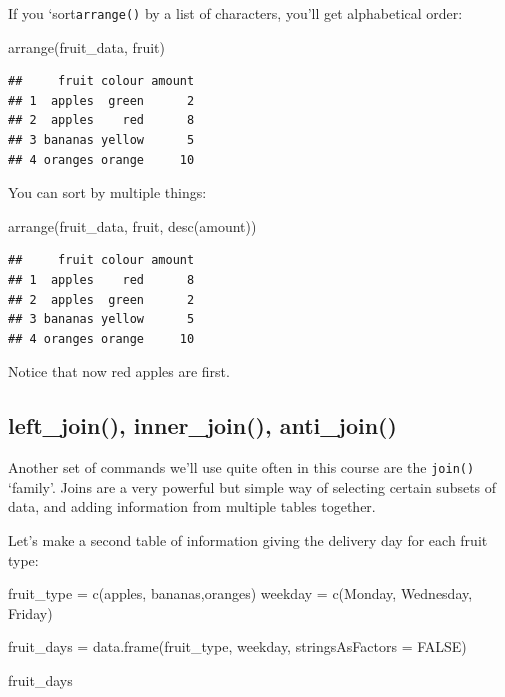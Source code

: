 \documentclass[
]{book}
\newenvironment{Shaded}{\begin{snugshade}}{\end{snugshade}}
\newcommand{\AttributeTok}[1]{\textcolor[rgb]{0.77,0.63,0.00}{#1}}
\newcommand{\ConstantTok}[1]{\textcolor[rgb]{0.00,0.00,0.00}{#1}}
\newcommand{\FunctionTok}[1]{\textcolor[rgb]{0.00,0.00,0.00}{#1}}
\newcommand{\NormalTok}[1]{#1}
\newcommand{\OtherTok}[1]{\textcolor[rgb]{0.56,0.35,0.01}{#1}}
\newcommand{\StringTok}[1]{\textcolor[rgb]{0.31,0.60,0.02}{#1}}
\begin{document}
If you `sort\texttt{arrange()} by a list of characters, you'll get alphabetical order:

\begin{Shaded}
\begin{Highlighting}[]
\FunctionTok{arrange}\NormalTok{(fruit\_data, fruit)}
\end{Highlighting}
\end{Shaded}

\begin{verbatim}
##     fruit colour amount
## 1  apples  green      2
## 2  apples    red      8
## 3 bananas yellow      5
## 4 oranges orange     10
\end{verbatim}

You can sort by multiple things:

\begin{Shaded}
\begin{Highlighting}[]
\FunctionTok{arrange}\NormalTok{(fruit\_data, fruit, }\FunctionTok{desc}\NormalTok{(amount))}
\end{Highlighting}
\end{Shaded}

\begin{verbatim}
##     fruit colour amount
## 1  apples    red      8
## 2  apples  green      2
## 3 bananas yellow      5
## 4 oranges orange     10
\end{verbatim}

Notice that now red apples are first.

\hypertarget{left_join-inner_join-anti_join}{%
\subsection{left\_join(), inner\_join(), anti\_join()}\label{left_join-inner_join-anti_join}}

Another set of commands we'll use quite often in this course are the \texttt{join()} `family'. Joins are a very powerful but simple way of selecting certain subsets of data, and adding information from multiple tables together.

Let's make a second table of information giving the delivery day for each fruit type:

\begin{Shaded}
\begin{Highlighting}[]
\NormalTok{fruit\_type }\OtherTok{=} \FunctionTok{c}\NormalTok{(}\StringTok{\textquotesingle{}apples\textquotesingle{}}\NormalTok{, }\StringTok{\textquotesingle{}bananas\textquotesingle{}}\NormalTok{,}\StringTok{\textquotesingle{}oranges\textquotesingle{}}\NormalTok{)}
\NormalTok{weekday }\OtherTok{=} \FunctionTok{c}\NormalTok{(}\StringTok{\textquotesingle{}Monday\textquotesingle{}}\NormalTok{, }\StringTok{\textquotesingle{}Wednesday\textquotesingle{}}\NormalTok{, }\StringTok{\textquotesingle{}Friday\textquotesingle{}}\NormalTok{)}

\NormalTok{fruit\_days }\OtherTok{=} \FunctionTok{data.frame}\NormalTok{(fruit\_type, weekday, }\AttributeTok{stringsAsFactors =} \ConstantTok{FALSE}\NormalTok{)}

\NormalTok{fruit\_days}
\end{Highlighting}
\end{Shaded}
\end{document}
